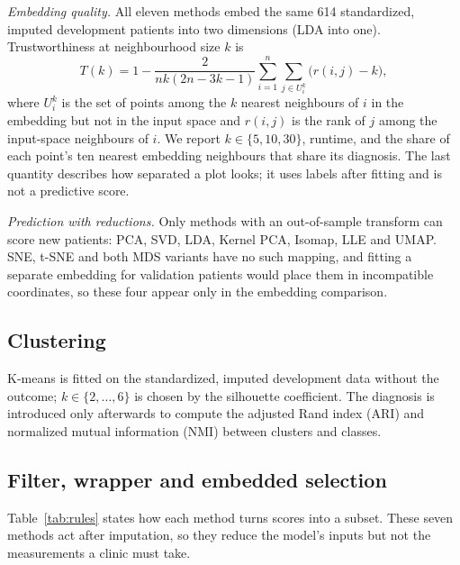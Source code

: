\documentclass[conference]{IEEEtran}
\begin{document}
\textit{Embedding quality.} All eleven methods embed the same 614 standardized, imputed development patients into two dimensions (LDA into one). Trustworthiness at neighbourhood size $k$ \cite{venna2001} is
\begin{equation}
T(k)=1-\frac{2}{nk(2n-3k-1)}\sum_{i=1}^{n}\sum_{j\in U_i^{k}}\bigl(r(i,j)-k\bigr),
\end{equation}
where $U_i^{k}$ is the set of points among the $k$ nearest neighbours of $i$ in the embedding but not in the input space and $r(i,j)$ is the rank of $j$ among the input-space neighbours of $i$. We report $k\in\{5,10,30\}$, runtime, and the share of each point's ten nearest embedding neighbours that share its diagnosis. The last quantity describes how separated a plot looks; it uses labels after fitting and is not a predictive score.

\textit{Prediction with reductions.} Only methods with an out-of-sample transform can score new patients: PCA, SVD, LDA, Kernel PCA, Isomap, LLE and UMAP. SNE, t-SNE and both MDS variants have no such mapping, and fitting a separate embedding for validation patients would place them in incompatible coordinates, so these four appear only in the embedding comparison.

\subsection{Clustering}
K-means is fitted on the standardized, imputed development data without the outcome; $k\in\{2,\dots,6\}$ is chosen by the silhouette coefficient. The diagnosis is introduced only afterwards to compute the adjusted Rand index (ARI) and normalized mutual information (NMI) between clusters and classes.

\subsection{Filter, wrapper and embedded selection}
Table~\ref{tab:rules} states how each method turns scores into a subset. These seven methods act after imputation, so they reduce the model's inputs but not the measurements a clinic must take.
\end{document}
